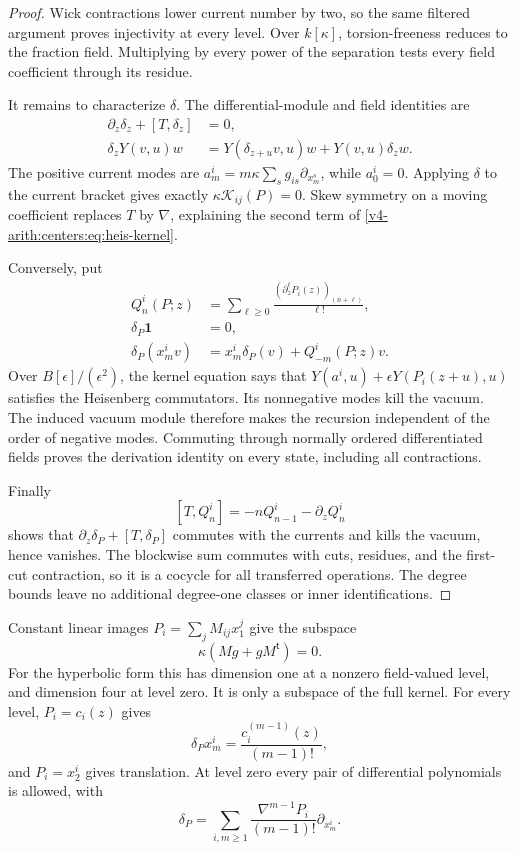 \begin{proof}
Wick contractions lower current
number by two, so the same
filtered argument proves
injectivity at every level.
Over $k[\kappa]$, torsion-freeness
reduces to the fraction field.
Multiplying by every power
of the separation tests every
field coefficient through its
residue.

It remains to characterize
$\delta$. The differential-module
and field identities are
\[
\begin{split}
 \partial_z\delta_z+[T,\delta_z]&=0,\\
 \delta_zY(v,u)w
 &=Y(\delta_{z+u}v,u)w+Y(v,u)\delta_zw.
\end{split}
\]
The positive current modes are
$a^i_m=m\kappa\sum_sg_{is}\partial_{x^s_m}$,
while $a^i_0=0$.
Applying $\delta$ to the current
bracket gives exactly
$\kappa\mathcal K_{ij}(P)=0$.
Skew symmetry on a moving
coefficient replaces $T$
by $\nabla$, explaining the
second term of
\eqref{v4-arith:centers:eq:heis-kernel}.

Conversely, put
\begin{equation}\label{v4-arith:centers:eq:heis-reconstruct}
\begin{split}
 Q^i_n(P;z)&=\sum_{\ell\geq0}
       \frac{(\partial_z^\ell P_i(z))_{(n+\ell)}}{\ell!},\\
 \delta_P\mathbf1&=0,\\
 \delta_P(x^i_mv)&=x^i_m\delta_P(v)+Q^i_{-m}(P;z)v.
\end{split}
\end{equation}
Over $B[\epsilon]/(\epsilon^2)$,
the kernel equation says that
$Y(a^i,u)+\epsilon Y(P_i(z+u),u)$
satisfies the Heisenberg
commutators. Its nonnegative
modes kill the vacuum.
The induced vacuum module
therefore makes the recursion
independent of the order of
negative modes.
Commuting through normally
ordered differentiated fields
proves the derivation identity
on every state, including
all contractions.

Finally
\[
 [T,Q^i_n]=-nQ^i_{n-1}-\partial_zQ^i_n
\]
shows that
$\partial_z\delta_P+[T,\delta_P]$
commutes with the currents
and kills the vacuum, hence
vanishes.
The blockwise sum commutes
with cuts, residues, and the
first-cut contraction, so it
is a cocycle for all transferred
operations. The degree bounds
leave no additional degree-one
classes or inner identifications.
\end{proof}

Constant linear images
$P_i=\sum_jM_{ij}x^j_1$ give
the subspace
\[
 \kappa(Mg+gM^{\mathsf t})=0.
\]
For the hyperbolic form this
has dimension one at a
nonzero field-valued level,
and dimension four at level
zero. It is only a subspace
of the full kernel.
For every level, $P_i=c_i(z)$
gives
\[
 \delta_Px^i_m=
 \frac{c_i^{(m-1)}(z)}{(m-1)!},
\]
and $P_i=x^i_2$ gives translation.
At level zero every pair
of differential polynomials
is allowed, with
\[
 \delta_P=
 \sum_{i,m\geq1}
 \frac{\nabla^{m-1}P_i}{(m-1)!}
       \partial_{x^i_m}.
\]

